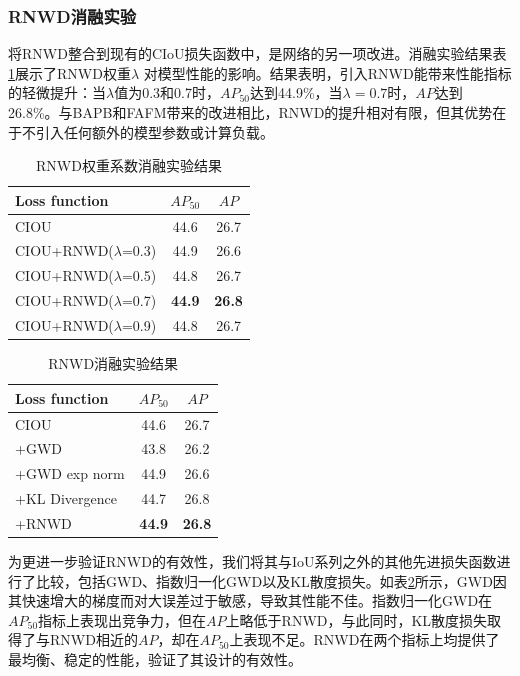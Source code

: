 \subsubsection{RNWD消融实验}
将RNWD整合到现有的CIoU损失函数中，是网络的另一项改进。消融实验结果表\ref{tab6}展示了RNWD权重$\lambda$ 对模型性能的影响。结果表明，引入RNWD能带来性能指标的轻微提升：当$\lambda$值为0.3和0.7时，$AP_{50}$达到44.9\%，当$\lambda=0.7$时，$AP$达到26.8\%。与BAPB和FAFM带来的改进相比，RNWD的提升相对有限，但其优势在于不引入任何额外的模型参数或计算负载。

\begin{table}[h!]
  \centering
  \caption{RNWD权重系数消融实验结果}
  \label{tab6}
  \begin{tabular*}{0.75\textwidth}{@{\extracolsep{\fill}}lcc}
    \toprule
    \textbf{Loss function} & \textbf{$AP_{50}$} & \textbf{$AP$} \\
    \midrule
    CIOU & 44.6 & 26.7 \\
    CIOU+RNWD($\lambda$=0.3) & 44.9 & 26.6 \\
    CIOU+RNWD($\lambda$=0.5) & 44.8 & 26.7 \\
    CIOU+RNWD($\lambda$=0.7) & \textbf{44.9} & \textbf{26.8} \\
    CIOU+RNWD($\lambda$=0.9) & 44.8 & 26.7 \\
    \bottomrule
  \end{tabular*}
\end{table}


\begin{table}[h!]
  \centering
  \caption{RNWD消融实验结果}
  \label{tab7}
  \begin{tabular*}{0.75\textwidth}{@{\extracolsep{\fill}}lcc}
    \toprule
    \textbf{Loss function} & \textbf{$AP_{50}$} & \textbf{$AP$} \\
    \midrule
    CIOU & 44.6 & 26.7 \\
    +GWD & 43.8 & 26.2 \\
    +GWD exp norm  & 44.9 & 26.6 \\
    +KL Divergence  & 44.7 & 26.8 \\
    +RNWD & \textbf{44.9} & \textbf{26.8} \\
    \bottomrule
  \end{tabular*}
\end{table}

为更进一步验证RNWD的有效性，我们将其与IoU系列之外的其他先进损失函数进行了比较，包括GWD、指数归一化GWD以及KL散度损失。如表\ref{tab7}所示，GWD因其快速增大的梯度而对大误差过于敏感，导致其性能不佳。指数归一化GWD在$AP_{50}$指标上表现出竞争力，但在$AP$上略低于RNWD，与此同时，KL散度损失取得了与RNWD相近的$AP$，却在$AP_{50}$上表现不足。RNWD在两个指标上均提供了最均衡、稳定的性能，验证了其设计的有效性。


